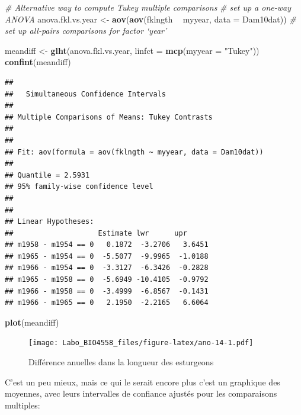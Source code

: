\documentclass[12pt,]{book}
\newenvironment{Shaded}{\begin{snugshade}}{\end{snugshade}}
\newcommand{\CommentTok}[1]{\textcolor[rgb]{0.56,0.35,0.01}{\textit{#1}}}
\newcommand{\DataTypeTok}[1]{\textcolor[rgb]{0.13,0.29,0.53}{#1}}
\newcommand{\KeywordTok}[1]{\textcolor[rgb]{0.13,0.29,0.53}{\textbf{#1}}}
\newcommand{\NormalTok}[1]{#1}
\newcommand{\OperatorTok}[1]{\textcolor[rgb]{0.81,0.36,0.00}{\textbf{#1}}}
\newcommand{\StringTok}[1]{\textcolor[rgb]{0.31,0.60,0.02}{#1}}
\begin{document}
\begin{Shaded}
\begin{Highlighting}[]
\CommentTok{# Alternative way to compute Tukey multiple comparisons}
\CommentTok{# set up a one-way ANOVA}
\NormalTok{anova.fkl.vs.year <-}\StringTok{ }\KeywordTok{aov}\NormalTok{(}\KeywordTok{aov}\NormalTok{(fklngth }\OperatorTok{~}\StringTok{ }\NormalTok{myyear, }\DataTypeTok{data =}\NormalTok{ Dam10dat))}
\CommentTok{# set up all-pairs comparisons for factor `year'}

\NormalTok{meandiff <-}\StringTok{ }\KeywordTok{glht}\NormalTok{(anova.fkl.vs.year, }\DataTypeTok{linfct =} \KeywordTok{mcp}\NormalTok{(}\DataTypeTok{myyear =}
\StringTok{"Tukey"}\NormalTok{))}
\KeywordTok{confint}\NormalTok{(meandiff)}
\end{Highlighting}
\end{Shaded}

\begin{verbatim}
## 
##   Simultaneous Confidence Intervals
## 
## Multiple Comparisons of Means: Tukey Contrasts
## 
## 
## Fit: aov(formula = aov(fklngth ~ myyear, data = Dam10dat))
## 
## Quantile = 2.5931
## 95% family-wise confidence level
##  
## 
## Linear Hypotheses:
##                    Estimate lwr      upr     
## m1958 - m1954 == 0   0.1872  -3.2706   3.6451
## m1965 - m1954 == 0  -5.5077  -9.9965  -1.0188
## m1966 - m1954 == 0  -3.3127  -6.3426  -0.2828
## m1965 - m1958 == 0  -5.6949 -10.4105  -0.9792
## m1966 - m1958 == 0  -3.4999  -6.8567  -0.1431
## m1966 - m1965 == 0   2.1950  -2.2165   6.6064
\end{verbatim}

\begin{Shaded}
\begin{Highlighting}[]
\KeywordTok{plot}\NormalTok{(meandiff)}
\end{Highlighting}
\end{Shaded}

\begin{figure}
\centering
\texttt{[image: Labo\_BIO4558\_files/figure-latex/ano-14-1.pdf]}
\caption{\label{fig:ano-14}Différence anuelles dans la longueur des esturgeons}
\end{figure}

C'est un peu mieux, mais ce qui le serait encore plus c'est un graphique des moyennes, avec leurs intervalles de confiance ajustés pour les comparaisons multiples:
\end{document}
